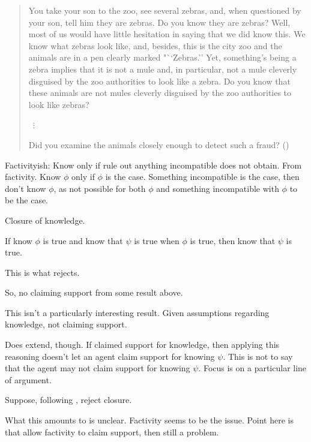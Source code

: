 \begin{note}
  \begin{quote}
    You take your son to the zoo, see several zebras, and, when questioned by your son, tell him they are zebras.
    Do you know they are zebras?
    Well, most of us would have little hesitation in saying that we did know this.
    We know what zebras look like, and, besides, this is the city zoo and the animals are in a pen clearly marked "``Zebras.''
    Yet, something's being a zebra implies that it is not a mule and, in particular, not a mule cleverly disguised by the zoo authorities to look like a zebra.
    Do you know that these animals are not mules cleverly disguised by the zoo authorities to look like zebras?

    \mbox{ }\hfill \(\vdots\) \hfill\mbox{ }

    Did you examine the animals closely enough to detect such a fraud?\linebreak
    \mbox{}\hfill\mbox{(\citeyear[1015--1016]{Dretske:1970to})}
  \end{quote}

  Factivityish: Know only if rule out anything incompatible does not obtain.
  From factivity.
  Know \(\phi\) only if \(\phi\) is the case.
  Something incompatible is the case, then don't know \(\phi\), as not possible for both \(\phi\) and something incompatible with \(\phi\) to be the case.

  \citeyear[1015]{Dretske:1970to}

  Closure of knowledge.

  If know \(\phi\) is true and know that \(\psi\) is true when \(\phi\) is true, then know that \(\psi\) is true. \citeyear[1011]{Dretske:1970to}

  This is what \citeauthor{Dretske:1970to} rejects.

  So, no claiming support from {\color{red} some result above}.

  This isn't a particularly interesting result.
  Given assumptions regarding knowledge, not claiming support.

  Does extend, though.
  If claimed support for knowledge, then applying this reasoning doesn't let an agent claim support for knowing \(\psi\).
  This is not to say that the agent may not claim support for knowing \(\psi\).
  Focus is on a particular line of argument.

  Suppose, following \citeauthor{Dretske:1970to}, reject closure.

  What this amounts to is unclear.
  Factivity seems to be the issue.
  Point here is that allow factivity to claim support, then still a problem.
\end{note}

